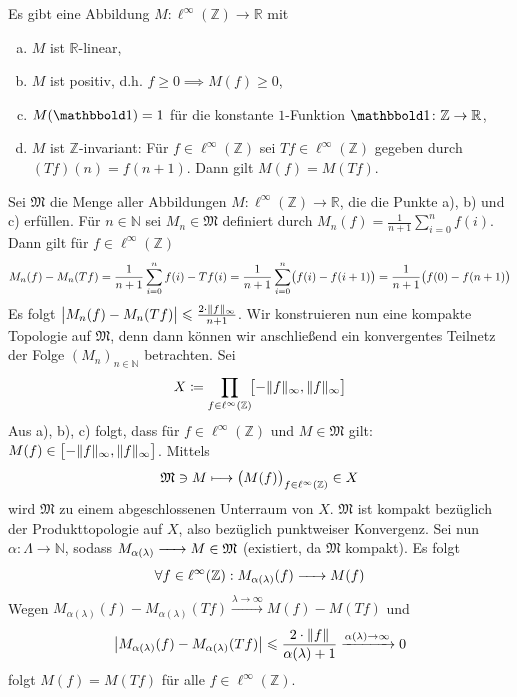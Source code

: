 \begin{satz}[{name={Mittelbarkeit}}]
	Es gibt eine Abbildung $M \colon \ell^\infty(\mathbb{Z}) \to \mathbb{R} $ mit
	\begin{enumerate}[a)]
		\item $M$ ist $\mathbb{R}$-linear,
		\item $M$ ist positiv, d.h. $f \ge 0 \implies M(f) \ge 0$,
		\item $M(\ind)=1$ für die konstante $1$-Funktion $\ind \colon \mathbb{Z} \to \mathbb{R}$,
		\item $M$ ist $\mathbb{Z}$-invariant: Für $f \in \ell^\infty(\mathbb{Z})$ sei $T f \in \ell^\infty(\mathbb{Z})$ gegeben durch $(T f) (n) = f(n+1)$. 
		Dann gilt $M(f)= M(T f)$.
	\end{enumerate}
\end{satz}
\begin{beweis}
	Sei $\mathfrak{M}$ die Menge aller Abbildungen $M \colon \ell^\infty(\mathbb{Z}) \to \mathbb{R}$, die die Punkte a), b) und c) erfüllen.
	Für $n \in \mathbb{N}$ sei $M_n \in \mathfrak{M}$ definiert durch 
	$M_n(f) = \frac{1}{n+1} \sum_{i=0}^{n} f(i)$. 
	Dann gilt für $f \in \ell^\infty(\mathbb{Z})$
	\[
		M_n(f) - M_n(T f) = \frac{1}{n+1} \sum_{i=0}^{n}  f(i) - T f(i) = \frac{1}{n+1} \sum_{i=0}^{n} \enbrace[\big]{f(i)- f(i+1) } = \frac{1}{n+1} \enbrace[\big]{f(0)- f(n+1)}
	\]
	Es folgt $\abs[\big]{M_n(f) - M_n(T f)} \le \frac{2 \cdot \norm{f}_\infty }{n+1}$. 
	Wir konstruieren nun eine kompakte Topologie auf $\mathfrak{M}$, denn dann können wir anschließend ein konvergentes Teilnetz der Folge $(M_n)_{n \in \mathbb{N}}$ betrachten. 
	Sei 
	\[
		X \coloneqq \prod_{f \in \ell^\infty(\mathbb{Z})} \!\benbrace[\big]{- \norm{f}_\infty, \norm{f}_\infty}
	\]
	Aus a), b), c) folgt, dass für $f \in \ell^\infty(\mathbb{Z})$ und $M \in \mathfrak{M}$ gilt: $M(f) \in \benbrace[\big]{- \norm{f}_\infty, \norm{f}_\infty}$. Mittels 
	\[
		\mathfrak{M} \ni M \longmapsto \enbrace[\big]{M(f)}_{f \in \ell^\infty(\mathbb{Z})} \in X 
	\]
	wird $\mathfrak{M}$ zu einem abgeschlossenen Unterraum von $X$. 
	$\mathfrak{M}$ ist kompakt bezüglich der Produkttopologie auf $X$, also bezüglich punktweiser Konvergenz.
	Sei nun $\alpha \colon \Lambda \to \mathbb{N}$, sodass $M_{\alpha(\lambda)} \grenzw{} M \in \mathfrak{M}$ (existiert, da $\mathfrak{M}$ kompakt). Es folgt
	\[
		\forall f \in \ell^\infty(\mathbb{Z}) : M_{\alpha(\lambda )}(f) \grenzw{} M(f) 
	\]
	Wegen $M_{\alpha(\lambda )}(f) - M_{\alpha(\lambda )}(T f) \xrightarrow{\lambda  \to \infty} M(f) - M(T f) $ und
	\begin{align*}
		\abs*{M_{\alpha(\lambda )}(f) - M_{\alpha(\lambda )}(T f)} \le \frac{2 \cdot \norm[\infty]{f} }{\alpha(\lambda )+1} \grenzw{\alpha(\lambda ) \to \infty} 0  
	\end{align*}
	folgt $M(f) = M(T f)$ für alle $f \in \ell^\infty(\mathbb{Z})$.
\end{beweis}

